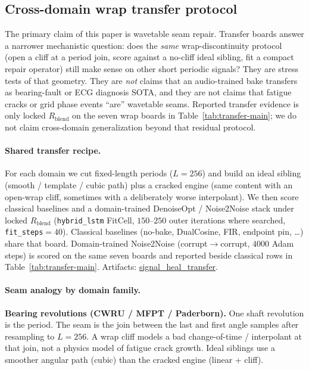 
\subsection{Cross-domain wrap transfer protocol}
\label{sec:transfer-protocol}

The primary claim of this paper is wavetable seam repair.
Transfer boards answer a narrower mechanistic question:
does the \emph{same} wrap-discontinuity protocol (open a cliff at a period join, score against a no-cliff ideal sibling, fit a compact repair operator) still make sense on other short periodic signals?
They are stress tests of that geometry.
They are \emph{not} claims that an audio-trained bake transfers as bearing-fault or ECG diagnosis SOTA,
and they are not claims that fatigue cracks or grid phase events ``are'' wavetable seams.
Reported transfer evidence is only locked $R_{\mathrm{blend}}$ on the seven wrap boards in Table~\ref{tab:transfer-main}; we do not claim cross-domain generalization beyond that residual protocol.

\paragraph{Shared transfer recipe.}
For each domain we cut fixed-length periods ($L{=}256$) and build an ideal sibling (smooth / template / cubic path) plus a cracked engine (same content with an open-wrap cliff, sometimes with a deliberately worse interpolant).
We then score classical baselines and a domain-trained DenoiseOpt / Noise2Noise stack under locked $R_{\mathrm{blend}}$ (\texttt{hybrid\_lstm} FitCell, $150$--$250$ outer iterations where searched, \texttt{fit\_steps}${}={}40$).
Classical baselines (no-bake, DualCosine, FIR, endpoint pin, \ldots) share that board.
Domain-trained Noise2Noise (corrupt$\to$corrupt, $4000$ Adam steps) is scored on the same seven boards and reported beside classical rows in Table~\ref{tab:transfer-main}.
Artifacts:
\href{https://github.com/reeldemo/reelsynth/tree/main/brand/artifacts/signal_heal_transfer}{signal\_heal\_transfer}.

\paragraph{Seam analogy by domain family.}
\textbf{Bearing revolutions (CWRU / MFPT / Paderborn).}
One shaft revolution is the period.
The seam is the join between the last and first angle samples after resampling to $L{=}256$.
A wrap cliff models a bad change-of-time / interpolant at that join, not a physics model of fatigue crack growth.
Ideal siblings use a smoother angular path (cubic) than the cracked engine (linear + cliff).

